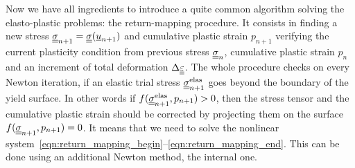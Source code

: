 \documentclass[12pt]{article}
\begin{document}
Now we have all ingredients to introduce a quite common algorithm solving the elasto-plastic problems: the return-mapping procedure. It consists in finding a new stress $\underline{\underline{\sigma}}_{n+1} = \underline{\underline{\sigma}}(\underline{u}_{n+1})$ and cumulative plastic strain $p_{n+1}$ verifying the current plasticity condition from previous stress $\underline{\underline{\sigma}}_{n}$, cumulative plastic strain $p_n$ and an increment of total deformation $\Delta\underline{\underline{\varepsilon}}$. The whole procedure checks on every Newton iteration, if an elastic trial stress $\underline{\underline{\sigma}}_{n+1}^{\text{elas}}$ goes beyond the boundary of the yield surface. In other words if $f(\underline{\underline{\sigma}}_{n+1}^{\text{elas}}, p_{n+1}) > 0$, then the stress tensor and the cumulative plastic strain should be corrected by projecting them on the surface $f(\underline{\underline{\sigma}}_{n+1}, p_{n+1}) = 0$. It means that we need to solve the nonlinear system~\eqref{eqn:return_mapping_begin}--\eqref{eqn:return_mapping_end}. This can be done using an additional Newton method, the internal one.

\end{document}
